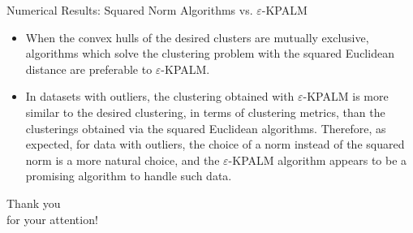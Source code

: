 \documentclass[9pt]{beamer}
\begin{document}
	\begin{frame}{Numerical Results: Squared Norm Algorithms vs. $\varepsilon$-KPALM}
		\setcounter{subfigure}{0}
		\begin{figure}
		    \centering
		\end{figure}
		\pause
		\begin{itemize}[<+->]
			\item When the convex hulls of the desired clusters are mutually exclusive, algorithms which solve the clustering problem with the squared Euclidean distance are preferable to $\varepsilon$-KPALM.
			\item In datasets with outliers, the clustering obtained with $\varepsilon$-KPALM is more similar to the desired clustering, in terms of clustering metrics, than the clusterings obtained via the squared Euclidean algorithms. 
				Therefore, as expected, for data  with outliers, the choice of a norm instead of the squared norm is a more natural choice, and the $\varepsilon$-KPALM algorithm appears to be a promising algorithm to handle such data.
		\end{itemize}
	\end{frame}
	
	\begin{frame}
		\begin{center}
			Thank you\\ for your attention!
		\end{center}
	\end{frame}		
	
\end{document}
